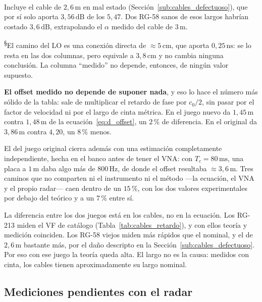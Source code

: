 \documentclass[12pt, a4paper, twoside]{report}
\begin{document}
\begin{table}[H]
\begin{minipage}{0.92\linewidth}
    \textsuperscript{\ddag}Incluye el cable de $2{,}6\,\text{m}$ en mal
    estado (Sección~\ref{sub:cables_defectuoso}), que por sí solo
    aporta $3{,}56\,\text{dB}$ de los $5{,}47$. Dos RG-58 sanos de esos
    largos habrían costado $3{,}6\,\text{dB}$, extrapolando el $\alpha$
    medido del cable de $3\,\text{m}$.

    \textsuperscript{\S}El camino del LO es una conexión directa de
    $\approx 5\,\text{cm}$, que aporta $0{,}25\,\text{ns}$: se lo resta
    en las dos columnas, pero equivale a $3{,}8\,\text{cm}$ y no cambia
    ninguna conclusión. La columna ``medido'' no depende, entonces, de
    ningún valor supuesto.
  \end{minipage}
\end{table}

\textbf{El offset medido no depende de suponer nada}, y eso lo hace el
número más sólido de la tabla: sale de multiplicar el retardo de fase
por $c_0/2$, sin pasar por el factor de velocidad ni por el largo de
cinta métrica. En el juego nuevo da $1{,}45\,\text{m}$ contra
$1{,}48\,\text{m}$ de la ecuación~\eqref{eq:d_offset}, un $2$\,\% de
diferencia. En el original da $3{,}86\,\text{m}$ contra $4{,}20$, un
$8$\,\% menos.

El del juego original cierra además con una estimación completamente
independiente, hecha en el banco antes de tener el VNA: con
$T_c = 80\,\text{ms}$, una placa a $1\,\text{m}$ daba algo más de
$800\,\text{Hz}$, de donde el offset resultaba
$\approx 3{,}6\,\text{m}$. Tres caminos que no comparten ni el
instrumento ni el método ---la ecuación, el VNA y el propio radar---
caen dentro de un $15$\,\%, con los dos valores experimentales por
debajo del teórico y a un $7$\,\% entre sí.

La diferencia entre los dos juegos está en los cables, no en la
ecuación. Los RG-213 miden el VF de catálogo
(Tabla~\ref{tab:cables_retardo}), y con ellos teoría y medición
coinciden. Los RG-58 viejos miden más rápidos que el nominal, y el de
$2{,}6\,\text{m}$ bastante más, por el daño descripto en la
Sección~\ref{sub:cables_defectuoso}. Por eso con ese juego la teoría
queda alta. El largo no es la causa: medidos con cinta, los cables
tienen aproximadamente su largo nominal.

\subsection{Mediciones pendientes con el radar}
\label{sub:cables_pendiente}
\end{document}
